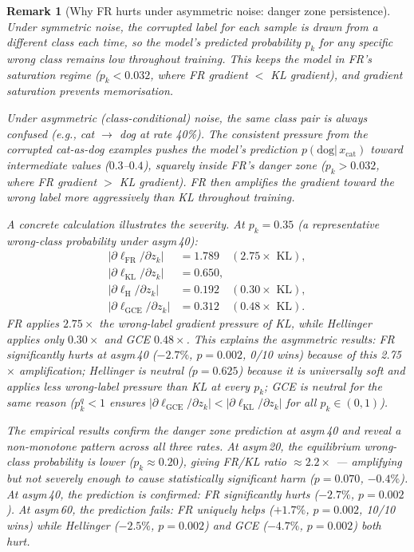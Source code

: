 \documentclass[11pt]{article}
\newtheorem{remark}{Remark}
\begin{document}
\begin{remark}[Why FR hurts under asymmetric noise: danger zone persistence]
\label{rem:asym_failure}
Under symmetric noise, the corrupted label for each sample is drawn from a
\emph{different} class each time, so the model's predicted probability $p_k$
for any specific wrong class remains low throughout training.
This keeps the model in FR's saturation regime ($p_k < 0.032$, where FR gradient $<$ KL
gradient), and gradient saturation prevents memorisation.

Under asymmetric (class-conditional) noise, the same class pair is always confused
(e.g., cat $\to$ dog at rate 40\%).
The consistent pressure from the corrupted cat-as-dog examples pushes the model's
prediction $p(\text{dog}|\,x_\text{cat})$ toward intermediate values ($0.3$--$0.4$),
squarely inside FR's \emph{danger zone} ($p_k > 0.032$, where FR gradient $>$ KL gradient).
FR then amplifies the gradient toward the wrong label \emph{more aggressively} than KL
throughout training.

A concrete calculation illustrates the severity.
At $p_k = 0.35$ (a representative wrong-class probability under asym\,40):
\begin{align*}
  |\partial\ell_\mathrm{FR}/\partial z_k| &= 1.789 \quad (2.75\times \text{ KL}), \\
  |\partial\ell_\mathrm{KL}/\partial z_k| &= 0.650, \\
  |\partial\ell_\mathrm{H}/\partial z_k|  &= 0.192 \quad (0.30\times \text{ KL}), \\
  |\partial\ell_\mathrm{GCE}/\partial z_k|&= 0.312 \quad (0.48\times \text{ KL}).
\end{align*}
FR applies $2.75\times$ the wrong-label gradient pressure of KL, while Hellinger
applies only $0.30\times$ and GCE $0.48\times$.
This explains the asymmetric results: FR significantly hurts at asym\,40 ($-2.7\%$,
$p=0.002$, 0/10 wins) because of this 2.75$\times$ amplification; Hellinger
is neutral ($p=0.625$) because it is \emph{universally soft} and applies less
wrong-label pressure than KL at every $p_k$; GCE is neutral for the same reason
($p_k^q < 1$ ensures $|\partial\ell_\mathrm{GCE}/\partial z_k| < |\partial\ell_\mathrm{KL}/\partial z_k|$
for all $p_k\in(0,1)$).

The empirical results confirm the danger zone prediction at asym\,40 and reveal
a non-monotone pattern across all three rates.
At asym\,20, the equilibrium wrong-class probability is lower ($p_k\approx 0.20$),
giving FR/KL ratio $\approx 2.2\times$ — amplifying but not severely enough to
cause statistically significant harm ($p=0.070$, $-0.4\%$).
At asym\,40, the prediction is confirmed: FR significantly hurts ($-2.7\%$, $p=0.002$).
At asym\,60, the prediction fails: FR \emph{uniquely helps} ($+1.7\%$, $p=0.002$, 10/10 wins)
while Hellinger ($-2.5\%$, $p=0.002$) and GCE ($-4.7\%$, $p=0.002$) both hurt.


\end{remark}
\end{document}
